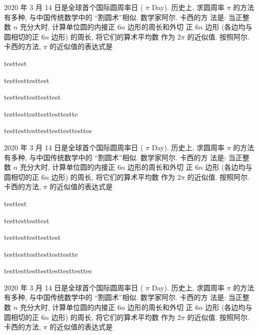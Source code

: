 \documentclass{ctexart}
\begin{document}
  2020 年 3 月 14 日是全球首个国际圆周率日 ( $\pi$ Day). 历史上, 求圆周率 $\pi$ 的方法有多种, 与中国传统数学中的 “割圆术”相似. 数学家阿尔. 卡西的方 法是: 当正整数 $n$ 充分大时, 计算单位圆的内接正 $6 n$ 边形的周长和外切 正 $6 n$ 边形 (各边均与圆相切的正 $6 n$ 边形) 的周长, 将它们的算术平均数 作为 $2 \pi$ 的近似值. 按照阿尔. 卡西的方法, $\pi$ 的近似值的表达式是 \paren

    \begin{xchoices}[items = 1]
      \item testtest
      \item testtesttesttest
      \item testtesttesttesttest
      \item testtesttesttesttesttestte
      \item testtesttesttesttesttesttesttes
    \end{xchoices}

    2020 年 3 月 14 日是全球首个国际圆周率日 ( $\pi$ Day). 历史上, 求圆周率 $\pi$ 的方法有多种, 与中国传统数学中的 “割圆术”相似. 数学家阿尔. 卡西的方 法是: 当正整数 $n$ 充分大时, 计算单位圆的内接正 $6 n$ 边形的周长和外切 正 $6 n$ 边形 (各边均与圆相切的正 $6 n$ 边形) 的周长, 将它们的算术平均数 作为 $2 \pi$ 的近似值. 按照阿尔. 卡西的方法, $\pi$ 的近似值的表达式是 \paren

    \begin{xchoices}[items = 2]
      \item testtest
      \item testtesttesttest
      \item testtesttesttesttest
      \item testtesttesttesttesttestte
      \item testtesttesttesttesttesttesttes
    \end{xchoices}

    2020 年 3 月 14 日是全球首个国际圆周率日 ( $\pi$ Day). 历史上, 求圆周率 $\pi$ 的方法有多种, 与中国传统数学中的 “割圆术”相似. 数学家阿尔. 卡西的方 法是: 当正整数 $n$ 充分大时, 计算单位圆的内接正 $6 n$ 边形的周长和外切 正 $6 n$ 边形 (各边均与圆相切的正 $6 n$ 边形) 的周长, 将它们的算术平均数 作为 $2 \pi$ 的近似值. 按照阿尔. 卡西的方法, $\pi$ 的近似值的表达式是 \paren
\end{document}
